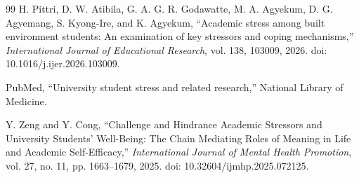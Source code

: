 \documentclass[conference]{IEEEtran}
\begin{document}
\begin{thebibliography}{99}
H. Pittri, D. W. Atibila, G. A. G. R. Godawatte,
M. A. Agyekum, D. G. Agyemang, S. Kyong-Ire,
and K. Agyekum,
``Academic stress among built environment students: An examination of key stressors and coping mechanisms,''
\textit{International Journal of Educational Research},
vol. 138, 103009, 2026.
doi: 10.1016/j.ijer.2026.103009.

PubMed,
``University student stress and related research,''
National Library of Medicine.

Y. Zeng and Y. Cong,
``Challenge and Hindrance Academic Stressors and University Students' Well-Being: The Chain Mediating Roles of Meaning in Life and Academic Self-Efficacy,''
\textit{International Journal of Mental Health Promotion},
vol. 27, no. 11, pp. 1663--1679, 2025.
doi: 10.32604/ijmhp.2025.072125.

\end{thebibliography}
\end{document}
